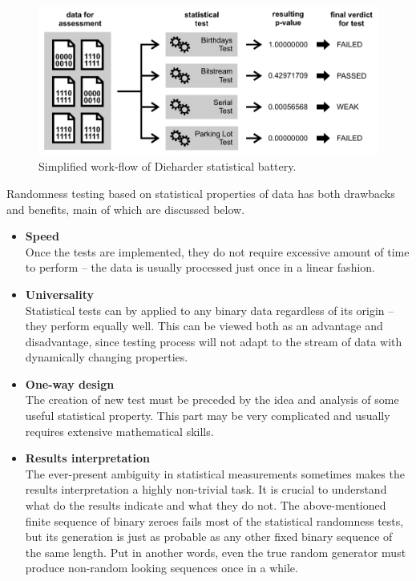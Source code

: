\documentclass[12pt,oneside]{fithesis2}		%
\renewcommand{\_}{\leavevmode \kern0.0em\vbox{\hrule width0.4em}}
\newcommand{\squarebullet}{\textcolor{black}{\raisebox{0.15em}{\rule{4pt}{4pt}}}}
\newenvironment{myItemize}{
  \begin{itemize}[leftmargin=2em,rightmargin=1em,itemsep=\parskip ,parsep=0em,topsep=0em,partopsep=0em]
  \renewcommand{\labelitemi}{\squarebullet}
  \renewcommand{\labelitemii}{$\diamond$}
}{
  \end{itemize}
}
\begin{document}
\begin{figure}[b!]
\centering
\includegraphics[width=\textwidth]{images/workflow-statistical-batteries}
\caption{Simplified work-flow of Dieharder statistical battery.}
\label{fig:workflow-statistical-batteries}
\end{figure}

Randomness testing based on statistical properties of data has both drawbacks and benefits, main of which are discussed below.
\begin{myItemize}
\item \textbf{Speed}\\
Once the tests are implemented, they do not require excessive amount of time to perform -- 
the data is usually processed just once in a linear fashion.
\item \textbf{Universality}\\
Statistical tests can by applied to any binary data regardless of its origin -- they perform equally well. 
This can be viewed both as an advantage and disadvantage, since testing process will not adapt to the stream of
data with dynamically changing properties.
\item \textbf{One-way design}\\
The creation of new test must be preceded by the idea and analysis of some useful statistical property. This part may be 
very complicated and usually requires extensive mathematical skills.
\item \textbf{Results interpretation}\\
The ever-present ambiguity in statistical measurements sometimes makes the results interpretation a highly non-trivial task.
It is crucial to understand what do the results indicate and what they do not. The above-mentioned finite sequence of binary zeroes
fails most of the statistical randomness tests, but its generation is just as probable 
as any other fixed binary sequence of the same length.
Put in another words, even the true random generator must produce non-random looking sequences once in a while.
\end{myItemize}
\end{document}

